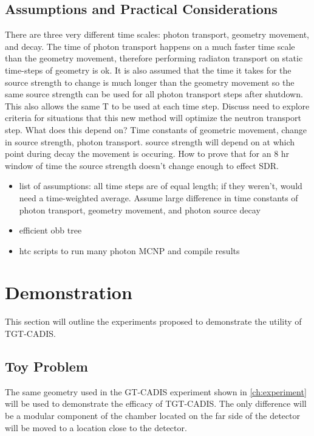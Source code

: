 \subsection{Assumptions and Practical Considerations}
There are three very different time scales: photon transport,
geometry movement, and decay.  The time of photon transport happens on a much
faster time scale than the geometry movement, therefore performing radiaton
transport on static time-steps of geometry is ok.  It is also assumed that the
time it takes for the source strength to change is much longer than the
geometry movement so the same source strength can be used for all photon
transport steps after shutdown.  This also allows the same T to be used at each time
step.
Discuss need to explore criteria for situations that this new method will
optimize the neutron transport step.  What does this depend on?  Time constants
of geometric movement, change in source strength, photon transport.  source
strength will depend on at which point during decay the movement is occuring.
How to prove that for an 8 hr window of time the source strength doesn't change
enough to effect SDR.
\begin{itemize}
		\item list of assumptions: all time steps are of equal length;
			if they weren't, would need a time-weighted average.
			Assume large difference in time constants of photon
			transport, geometry movement, and photon source decay
        \item efficient obb tree
	\item htc scripts to run many photon MCNP and compile results

\end{itemize}


\section{Demonstration} \label{sec:demo}
This section will outline the experiments proposed to demonstrate the utility
of TGT-CADIS.  

\subsection{Toy Problem}
The same geometry used in the GT-CADIS experiment shown in \ref{ch:experiment}
will be used to demonstrate the efficacy of TGT-CADIS.  The only difference
will be a modular component of the chamber located on the far side of the
detector will be moved to a location close to the detector.  

